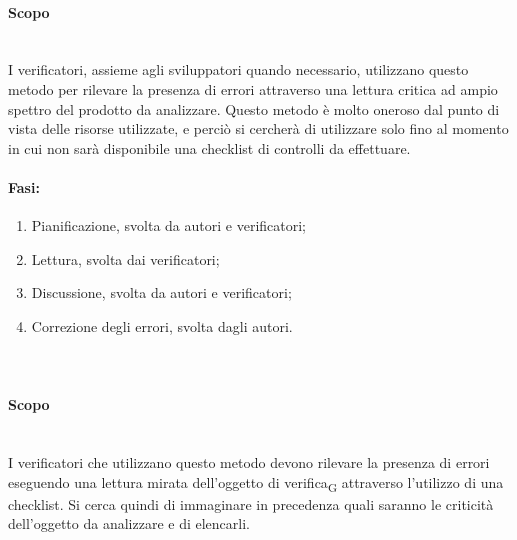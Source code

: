 \paragraph {Scopo}\mbox{}\\
I verificatori, assieme agli sviluppatori quando necessario, utilizzano questo metodo per rilevare la presenza di errori attraverso una lettura critica ad ampio spettro del prodotto da analizzare. Questo metodo è molto oneroso dal punto di vista delle risorse utilizzate, e perciò si cercherà di utilizzare solo fino al momento in cui non sarà disponibile una checklist di controlli da effettuare.
\paragraph {Fasi:}\:
\begin{enumerate}
	\item Pianificazione, svolta da autori e verificatori;
	\item Lettura, svolta dai verificatori;
	\item Discussione, svolta da autori e verificatori;
	\item Correzione degli errori, svolta dagli autori.
\end{enumerate}
\paragraph {}\mbox{}\\
\paragraph {Scopo}\mbox{}\\
I verificatori che utilizzano questo metodo devono rilevare la presenza di errori eseguendo una lettura mirata dell’oggetto di verifica\textsubscript{G} attraverso l'utilizzo di una checklist. Si cerca quindi di immaginare in precedenza quali saranno le criticità dell'oggetto da analizzare e di elencarli.
